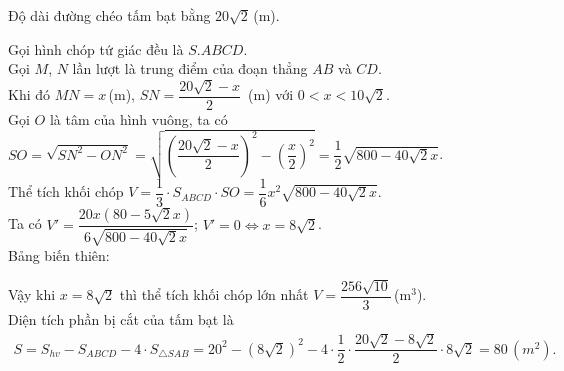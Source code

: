 \begin{bt}
{Độ dài đường chéo tấm bạt bằng $20 \sqrt{2}$\,(m).

Gọi hình chóp tứ giác đều là $S.ABCD$.\\
Gọi $M$, $N$ lần lượt là trung điểm của đoạn thẳng $AB$ và $CD$.\\
Khi đó $MN=x$\,(m), $SN=\dfrac{20 \sqrt{2}-x}{2}$\, (m) với $0<x<10 \sqrt{2}$.\\
Gọi $O$ là tâm của hình vuông, ta có\\
$SO=\sqrt{SN^2-ON^2}=\sqrt{\left(\dfrac{20 \sqrt{2}-x}{2}\right)^2-\left(\dfrac{x}{2}\right)^2}=\dfrac{1}{2} \sqrt{800-40 \sqrt{2}x}$.\\
Thể tích khối chóp $V=\dfrac{1}{3}\cdot S_{ABCD} \cdot SO=\dfrac{1}{6} x^2 \sqrt{800-40 \sqrt{2} x}$.\\
Ta có $V'=\dfrac{20 x(80-5 \sqrt{2} x)}{6 \sqrt{800-40 \sqrt{2} x}}$; $V'=0 \Leftrightarrow x=8 \sqrt{2}$.\\
Bảng biến thiên:
\begin{center}
\end{center}
Vậy khi $x=8 \sqrt{2}$ thì thể tích khối chóp lớn nhất $V=\dfrac{256 \sqrt{10}}{3}$\,(m$^3$).\\
Diện tích phần bị cắt của tấm bạt là
\begin{eqnarray*}
S=S_{hv}-S_{ABCD}-4 \cdot S_{\triangle {SAB}}=20^2-(8 \sqrt{2})^2-4 \cdot \dfrac{1}{2} \cdot \dfrac{20 \sqrt{2}-8 \sqrt{2}}{2} \cdot 8 \sqrt{2}=80\,(m^2).
\end{eqnarray*}
}
\end{bt}

